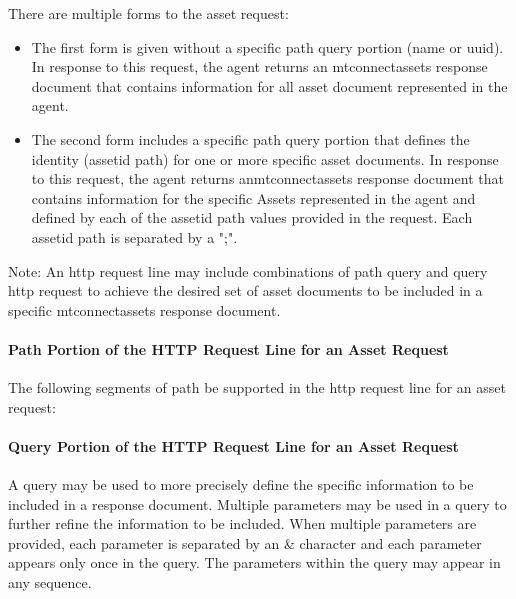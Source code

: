 There are multiple forms to the \gls{asset request}:

\begin{itemize}
\item The first form is given without a specific \gls{path query} portion (\gls{name} or \gls{uuid}).  In response to this \gls{request}, the \gls{agent} returns an \gls{mtconnectassets response document} that contains information for all \gls{asset document} represented in the \gls{agent}.


\item The second form includes a specific \gls{path query} portion that defines the identity (\gls{assetid path}) for one or more specific \glspl{asset document}.  In response to this \gls{request}, the \gls{agent} returns an\gls{mtconnectassets response document} that contains information for the specific Assets represented in the \gls{agent} and defined by each of the \gls{assetid path} values provided in the \gls{request}.  Each \gls{assetid path} is separated by a ";".

\end{itemize}

\begin{note}
Note: An \gls{http request line} may include combinations of \gls{path query} and \gls{query http request} to achieve the desired set of \glspl{asset document} to be included in a specific \gls{mtconnectassets response document}.

\end{note}

\paragraph{Path Portion of the HTTP Request Line for an Asset Request}\mbox{}

The following segments of path \MUST be supported in the \gls{http request line} for an \gls{asset request}:



\paragraph{Query Portion of the HTTP Request Line for an Asset Request}\mbox{}

A \gls{query} may be used to more precisely define the specific information to be included in a \gls{response document}.   Multiple parameters may be used in a \gls{query} to further refine the information to be included.  When multiple parameters are provided, each parameter is separated by an \& character and each parameter appears only once in the \gls{query}.  The parameters within the \gls{query} may appear in any sequence.

